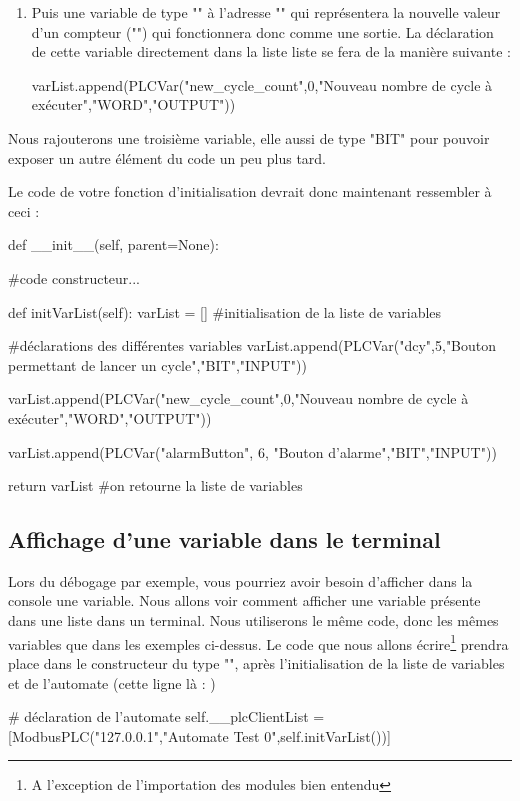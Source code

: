 {\begin{enumerate}
\item {}\newline
Puis une variable de type "" à l'adresse "" qui représentera la nouvelle valeur d'un compteur ("") qui fonctionnera donc comme une sortie.\newline
La déclaration de cette variable directement dans la liste liste  se fera de la manière suivante :
\begin{Python}
varList.append(PLCVar("new_cycle_count",0,"Nouveau nombre de cycle à exécuter","WORD","OUTPUT"))
\end{Python}

\end{enumerate}

Nous rajouterons une troisième variable, elle aussi de type "BIT" pour pouvoir exposer un autre élément du code un peu plus tard.

Le code de votre fonction d'initialisation devrait donc maintenant ressembler à ceci :
\begin{Python}
    def __init__(self, parent=None):
    
        #code constructeur...
        
    def initVarList(self):
	    varList = [] #initialisation de la liste de variables

    	#déclarations des différentes variables
	    varList.append(PLCVar("dcy",5,"Bouton permettant de lancer un cycle","BIT","INPUT"))

    	varList.append(PLCVar("new_cycle_count",0,"Nouveau nombre de cycle à exécuter","WORD","OUTPUT"))
    	
    	varList.append(PLCVar("alarmButton", 6, "Bouton d'alarme","BIT","INPUT"))

	    return varList  #on retourne la liste de variables
\end{Python}





\subsection{Affichage d'une variable dans le terminal}

Lors du débogage par exemple, vous pourriez avoir besoin d'afficher dans la console une variable. Nous allons voir comment afficher une variable présente dans une liste dans un terminal.\newline
Nous utiliserons le même code, donc les mêmes variables que dans les exemples ci-dessus.\newline
Le code que nous allons écrire\footnote{A l'exception de l'importation des modules bien entendu} prendra place dans le constructeur du type "", après l'initialisation de la liste de variables et de l'automate (cette ligne là : )
\begin{Python}
# déclaration de l’automate
self.__plcClientList = [ModbusPLC("127.0.0.1","Automate Test 0",self.initVarList())]
\end{Python}


}
